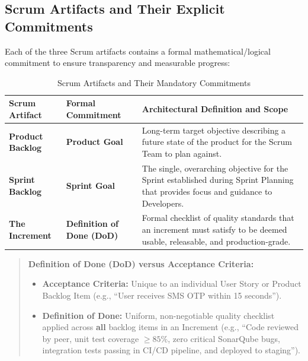 \subsection{Scrum Artifacts and Their Explicit Commitments}
Each of the three Scrum artifacts contains a formal mathematical/logical commitment to ensure transparency and measurable progress:
\begin{table}[htbp]
\centering
\small
\caption{Scrum Artifacts and Their Mandatory Commitments}
\label{tab:scrum_artifacts_commitments}
\begin{tabularx}{\textwidth}{l p{4.5cm} X}
\toprule
\textbf{Scrum Artifact} & \textbf{Formal Commitment} & \textbf{Architectural Definition and Scope} \\
\midrule
\textbf{Product Backlog} & \textbf{Product Goal} & Long-term target objective describing a future state of the product for the Scrum Team to plan against. \\
\textbf{Sprint Backlog} & \textbf{Sprint Goal} & The single, overarching objective for the Sprint established during Sprint Planning that provides focus and guidance to Developers. \\
\textbf{The Increment} & \textbf{Definition of Done (DoD)} & Formal checklist of quality standards that an increment must satisfy to be deemed usable, releasable, and production-grade. \\
\bottomrule
\end{tabularx}
\end{table}

\begin{quote}
\textbf{Definition of Done (DoD) versus Acceptance Criteria:}
\begin{itemize}
    \item \textbf{Acceptance Criteria:} Unique to an individual User Story or Product Backlog Item (e.g., ``User receives SMS OTP within 15 seconds'').
    \item \textbf{Definition of Done:} Uniform, non-negotiable quality checklist applied across \textbf{all} backlog items in an Increment (e.g., ``Code reviewed by peer, unit test coverage $\ge 85\%$, zero critical SonarQube bugs, integration tests passing in CI/CD pipeline, and deployed to staging'').
\end{itemize}
\end{quote}

